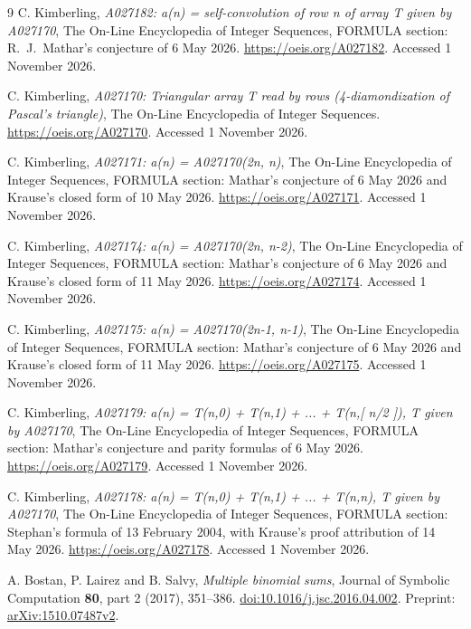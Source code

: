 \documentclass[11pt]{article}
\begin{document}
\begin{thebibliography}{9}
C. Kimberling, \emph{A027182: a(n) = self-convolution of row n of array
T given by A027170}, The On-Line Encyclopedia of Integer Sequences,
FORMULA section: R.\ J.\ Mathar's conjecture of 6 May 2026.
\url{https://oeis.org/A027182}. Accessed 1 November 2026.

C. Kimberling, \emph{A027170: Triangular array T read by rows
(4-diamondization of Pascal's triangle)},
The On-Line Encyclopedia of Integer Sequences.
\url{https://oeis.org/A027170}. Accessed 1 November 2026.

C. Kimberling, \emph{A027171: a(n) = A027170(2n, n)},
The On-Line Encyclopedia of Integer Sequences,
FORMULA section: Mathar's conjecture of 6 May 2026 and Krause's closed
form of 10 May 2026. \url{https://oeis.org/A027171}.
Accessed 1 November 2026.

C. Kimberling, \emph{A027174: a(n) = A027170(2n, n-2)},
The On-Line Encyclopedia of Integer Sequences,
FORMULA section: Mathar's conjecture of 6 May 2026 and Krause's closed
form of 11 May 2026. \url{https://oeis.org/A027174}.
Accessed 1 November 2026.

C. Kimberling, \emph{A027175: a(n) = A027170(2n-1, n-1)},
The On-Line Encyclopedia of Integer Sequences,
FORMULA section: Mathar's conjecture of 6 May 2026 and Krause's closed
form of 11 May 2026. \url{https://oeis.org/A027175}.
Accessed 1 November 2026.

C. Kimberling, \emph{A027179: a(n) = T(n,0) + T(n,1) + ... + T(n,[ n/2 ]),
T given by A027170}, The On-Line Encyclopedia of Integer Sequences,
FORMULA section: Mathar's conjecture and parity formulas of 6 May 2026.
\url{https://oeis.org/A027179}. Accessed 1 November 2026.

C. Kimberling, \emph{A027178: a(n) = T(n,0) + T(n,1) + ... + T(n,n),
T given by A027170}, The On-Line Encyclopedia of Integer Sequences,
FORMULA section: Stephan's formula of 13 February 2004, with Krause's
proof attribution of 14 May 2026.
\url{https://oeis.org/A027178}. Accessed 1 November 2026.

A. Bostan, P. Lairez and B. Salvy, \emph{Multiple binomial sums},
Journal of Symbolic Computation \textbf{80}, part 2 (2017), 351--386.
\href{https://doi.org/10.1016/j.jsc.2016.04.002}{doi:10.1016/j.jsc.2016.04.002}.
Preprint: \href{https://arxiv.org/abs/1510.07487v2}{arXiv:1510.07487v2}.
\end{thebibliography}
\end{document}
